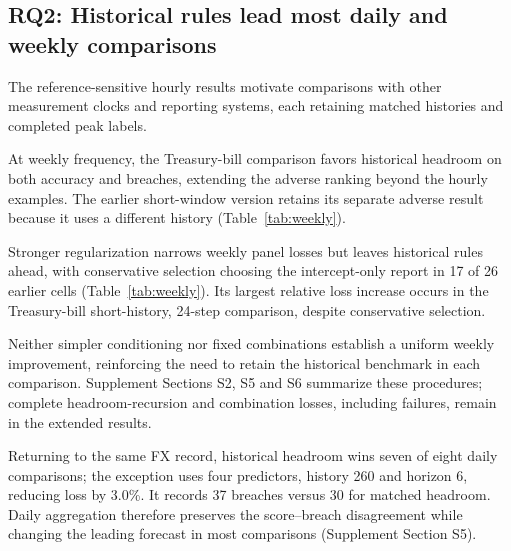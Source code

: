 \documentclass{rQUF2e}
\begin{document}
\subsection{RQ2: Historical rules lead most daily and weekly comparisons}

The reference-sensitive hourly results motivate comparisons with other measurement clocks and reporting systems, each retaining matched histories and completed peak labels.

At weekly frequency, the Treasury-bill comparison favors historical headroom on both accuracy and breaches, extending the adverse ranking beyond the hourly examples. The earlier short-window version retains its separate adverse result because it uses a different history (Table~\ref{tab:weekly}).

Stronger regularization narrows weekly panel losses but leaves historical rules ahead, with conservative selection choosing the intercept-only report in 17 of 26 earlier cells (Table~\ref{tab:weekly}). Its largest relative loss increase occurs in the Treasury-bill short-history, 24-step comparison, despite conservative selection.

Neither simpler conditioning nor fixed combinations establish a uniform weekly improvement, reinforcing the need to retain the historical benchmark in each comparison. Supplement Sections S2, S5 and S6 summarize these procedures; complete headroom-recursion and combination losses, including failures, remain in the extended results.

Returning to the same FX record, historical headroom wins seven of eight daily comparisons; the exception uses four predictors, history 260 and horizon 6, reducing loss by 3.0\%. It records 37 breaches versus 30 for matched headroom. Daily aggregation therefore preserves the score--breach disagreement while changing the leading forecast in most comparisons (Supplement Section S5).
\end{document}
